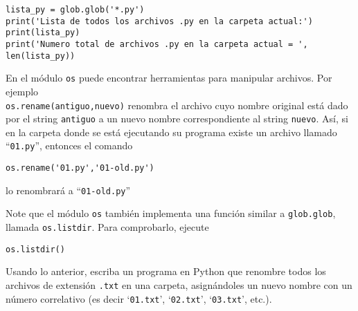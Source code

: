 \documentclass[11pt]{exam}
\begin{document}
\begin{questions}
\begin{verbatim}
lista_py = glob.glob('*.py')
print('Lista de todos los archivos .py en la carpeta actual:')
print(lista_py)
print('Numero total de archivos .py en la carpeta actual = ', len(lista_py))
\end{verbatim}

\item En el módulo \texttt{os} puede encontrar herramientas para manipular archivos. Por ejemplo \\ \texttt{os.rename(antiguo,nuevo)} renombra el archivo cuyo nombre original está dado por el string \texttt{antiguo} a un nuevo nombre correspondiente al string \texttt{nuevo}. Así, si en la carpeta donde se está ejecutando su programa existe un archivo llamado ``\texttt{01.py}'', entonces el comando 
\begin{verbatim}
os.rename('01.py','01-old.py')
\end{verbatim}

lo renombrará a ``\texttt{01-old.py}''

\item Note que el módulo \texttt{os} también implementa una función similar a \texttt{glob.glob}, llamada \texttt{os.listdir}. Para comprobarlo, ejecute
\begin{verbatim}
os.listdir()
\end{verbatim}

\item Usando lo anterior, escriba un programa en Python que renombre todos los archivos de extensión \texttt{.txt} en una carpeta, asignándoles un nuevo nombre con un número correlativo (es decir `\texttt{01.txt}', `\texttt{02.txt}', `\texttt{03.txt}', etc.).
\end{questions}
\end{document}
